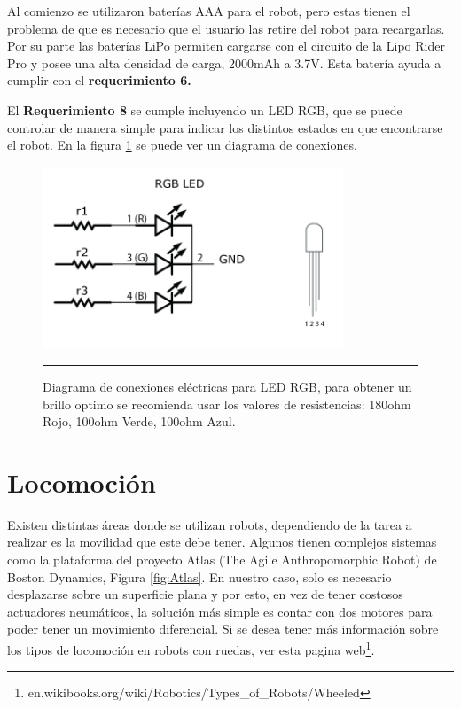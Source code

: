 Al comienzo se utilizaron baterías AAA para el robot, pero estas tienen el problema de que es necesario que el usuario las retire del robot para recargarlas. Por su parte las baterías LiPo permiten cargarse con el circuito de la Lipo Rider Pro y posee una alta densidad de carga, 2000mAh a 3.7V. Esta batería ayuda a cumplir con el \textbf{requerimiento 6.}

El \textbf{Requerimiento 8} se cumple incluyendo un LED RGB, que se puede controlar de manera simple para indicar los distintos estados en que encontrarse el robot. En la figura \ref{fig:LED} se puede ver un diagrama de conexiones.

\begin{figure}[htbp]
	\centering
		\includegraphics[width=0.8\textwidth]{./Figures/MODI/RGBLED.png}
		\rule{35em}{0.5pt}
	\caption[Conexión eléctrica LED RGB]{Diagrama de conexiones eléctricas para LED RGB, para obtener un brillo optimo se recomienda usar los valores de resistencias: 180ohm Rojo, 100ohm Verde, 100ohm Azul.}
	\label{fig:LED}
\end{figure}


\section{Locomoción}
Existen distintas áreas donde se utilizan robots, dependiendo de la tarea a realizar es la movilidad que este debe tener. Algunos tienen complejos sistemas como la plataforma del proyecto Atlas (The Agile Anthropomorphic Robot) de Boston Dynamics, Figura \ref{fig:Atlas}. En nuestro caso, solo es necesario desplazarse sobre un superficie plana y por esto, en vez de tener costosos actuadores neumáticos, la solución más simple es contar con dos motores para poder tener un movimiento diferencial. Si se desea tener más información sobre los tipos de locomoción en robots con ruedas, ver esta pagina web\footnote{en.wikibooks.org/wiki/Robotics/Types\_of\_Robots/Wheeled}.


